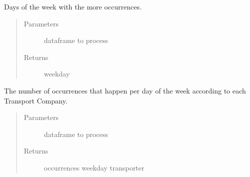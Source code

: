 \documentclass[letterpaper,10pt,english]{sphinxmanual}
\begin{document}
\begin{fulllineitems}
\label{\detokenize{algorithms:algorithms.idp.idp.get_df_occurrences_weekday}}
\sphinxAtStartPar
Days of the week with the more occurrences.
\begin{quote}\begin{description}
\item[{Parameters}] \leavevmode
\sphinxAtStartPar
{} \textendash{} dataframe to process

\item[{Returns}] \leavevmode
\sphinxAtStartPar
weekday

\end{description}\end{quote}

\end{fulllineitems}


\begin{fulllineitems}
\label{\detokenize{algorithms:algorithms.idp.idp.get_df_occurrences_weekday_transporter}}
\sphinxAtStartPar
The number of occurrences that happen per day of the week according to each Transport Company.
\begin{quote}\begin{description}
\item[{Parameters}] \leavevmode
\sphinxAtStartPar
{} \textendash{} dataframe to process

\item[{Returns}] \leavevmode
\sphinxAtStartPar
occurrences weekday transporter

\end{description}\end{quote}

\end{fulllineitems}

\end{document}
